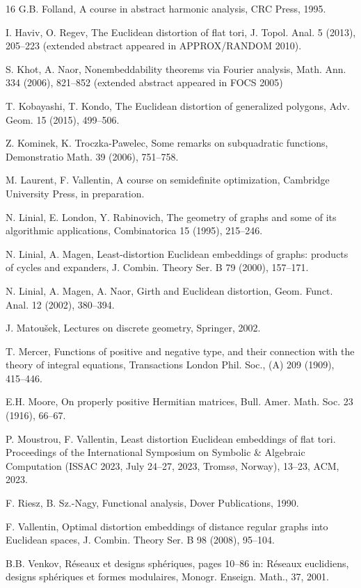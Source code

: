 \documentclass{amsart}
\begin{document}
\begin{thebibliography}{16}
  G.B. Folland,
  A course in abstract harmonic analysis,
  CRC Press, 1995.

  I. Haviv, O. Regev, The Euclidean distortion of flat tori,
 J. Topol. Anal. 5 (2013),  205--223 (extended abstract appeared in
 APPROX/RANDOM 2010).

 S. Khot, A. Naor, Nonembeddability theorems via Fourier analysis,
 Math. Ann. 334 (2006), 821--852 (extended abstract appeared in FOCS 2005)

T. Kobayashi, T. Kondo,
The Euclidean distortion of generalized polygons,
Adv. Geom. 15 (2015), 499--506.

Z. Kominek, K. Troczka-Pawelec, Some remarks on subquadratic
functions, Demonstratio Math. 39 (2006), 751--758.

  M. Laurent, F. Vallentin,
  A course on semidefinite optimization,
  Cambridge University Press, in preparation.

N. Linial, E. London, Y. Rabinovich, The geometry of graphs and some of its algorithmic applications, Combinatorica 15 (1995), 215--246.

  N. Linial, A. Magen,
  Least-distortion Euclidean embeddings of graphs: products of cycles and
  expanders,  J. Combin. Theory Ser. B 79 (2000), 157--171.

  N. Linial, A. Magen, A. Naor,
  Girth and Euclidean distortion,
  Geom. Funct. Anal. 12 (2002), 380--394.

J. Matou\v{s}ek, Lectures on discrete geometry,
Springer, 2002.

T. Mercer, Functions of positive and negative type, and their connection
with the theory of integral equations, Transactions London Phil. Soc., (A) 209 (1909), 415--446.

E.H. Moore, On properly positive Hermitian matrices,
Bull. Amer. Math. Soc. 23 (1916), 66--67.

  P. Moustrou, F. Vallentin,
  Least distortion Euclidean embeddings of flat tori.
  Proceedings of the International Symposium on Symbolic \& Algebraic
  Computation (ISSAC 2023, July 24--27, 2023, Troms\o, Norway), 13--23,
  ACM, 2023.

F. Riesz, B. Sz.-Nagy, Functional analysis, Dover Publications, 1990.

F. Vallentin,
Optimal distortion embeddings of distance regular graphs into
Euclidean spaces,
J. Combin. Theory Ser. B 98 (2008), 95--104.

 B.B. Venkov, R\'eseaux et designs sph\'eriques,
  pages 10--86 in: R\'eseaux euclidiens, designs sph\'eriques et formes modulaires,
Monogr. Enseign. Math., 37, 2001.

\end{thebibliography}
\end{document}

